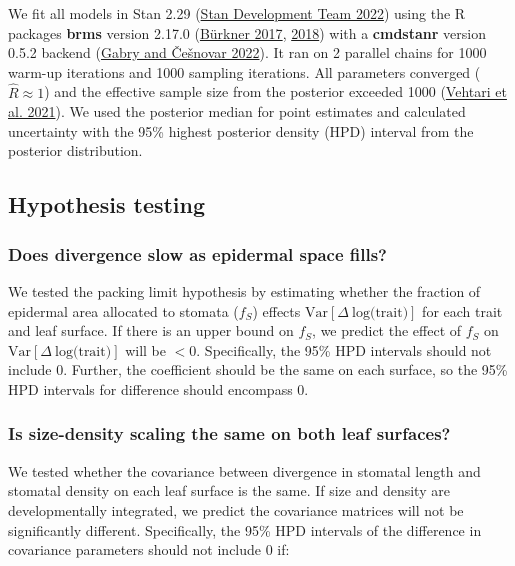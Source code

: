 \documentclass[
  12pt,
]{article}
\begin{document}
We fit all models in Stan 2.29 (\protect\hyperlink{ref-stan_development_team_stan_2022}{Stan Development Team 2022}) using the R packages \textbf{brms} version 2.17.0 (\protect\hyperlink{ref-burkner_brms_2017}{Bürkner 2017}, \protect\hyperlink{ref-burkner_advanced_2018}{2018}) with a \textbf{cmdstanr} version 0.5.2 backend (\protect\hyperlink{ref-gabry_cmdstanr_2022}{Gabry and Češnovar 2022}). It ran on 2 parallel chains for 1000 warm-up iterations and 1000 sampling iterations. All parameters converged (\(\hat{R} \approx 1\)) and the effective sample size from the posterior exceeded 1000 (\protect\hyperlink{ref-vehtari_rank-normalization_2021}{Vehtari et al. 2021}). We used the posterior median for point estimates and calculated uncertainty with the 95\% highest posterior density (HPD) interval from the posterior distribution.

\hypertarget{hypothesis-testing}{%
\subsection{Hypothesis testing}\label{hypothesis-testing}}

\hypertarget{does-divergence-slow-as-epidermal-space-fills}{%
\subsubsection{Does divergence slow as epidermal space fills?}\label{does-divergence-slow-as-epidermal-space-fills}}

We tested the packing limit hypothesis by estimating whether the fraction of epidermal area allocated to stomata (\(f_S\)) effects \(\textrm{Var}[\Delta~\textrm{log(trait)}]\) for each trait and leaf surface. If there is an upper bound on \(f_S\), we predict the effect of \(f_S\) on \(\textrm{Var}[\Delta~\textrm{log(trait)}]\) will be \(<0\). Specifically, the 95\% HPD intervals should not include 0. Further, the coefficient should be the same on each surface, so the 95\% HPD intervals for difference should encompass 0.

\hypertarget{is-size-density-scaling-the-same-on-both-leaf-surfaces}{%
\subsubsection{Is size-density scaling the same on both leaf surfaces?}\label{is-size-density-scaling-the-same-on-both-leaf-surfaces}}

We tested whether the covariance between divergence in stomatal length and stomatal density on each leaf surface is the same. If size and density are developmentally integrated, we predict the covariance matrices will not be significantly different. Specifically, the 95\% HPD intervals of the difference in covariance parameters should not include 0 if:
\end{document}
